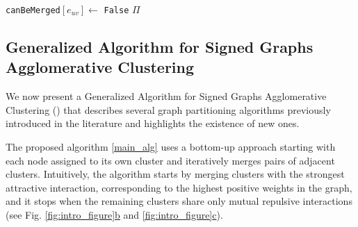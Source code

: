 \begin{algorithm}[t]
\begin{algorithmic}[1]
        \EndIf
          \State \texttt{canBeMerged}$[e_{uv}] \gets$ \texttt{False}
        \EndIf
      \EndWhile
      \State
      \Return $\Pi$
  \end{algorithmic}
  \label{main_alg}
\end{algorithm}



\subsection{Generalized Algorithm for Signed Graphs Agglomerative Clustering} \label{sec:algorithm}

We now present a Generalized Algorithm for Signed Graphs Agglomerative Clustering (\algname) that describes several graph partitioning algorithms previously introduced in the literature and highlights the existence of new ones.

The proposed algorithm \ref{main_alg} uses a bottom-up approach starting with each node assigned to its own cluster and iteratively merges pairs of adjacent clusters. Intuitively, the algorithm starts by merging clusters with the strongest attractive interaction, corresponding to the highest positive weights in the graph, and it stops when the remaining clusters share only mutual repulsive interactions (see Fig. \hyperref[fig:intro_figure]{\ref*{fig:intro_figure}b} and \hyperref[fig:intro_figure]{\ref*{fig:intro_figure}c}). 

